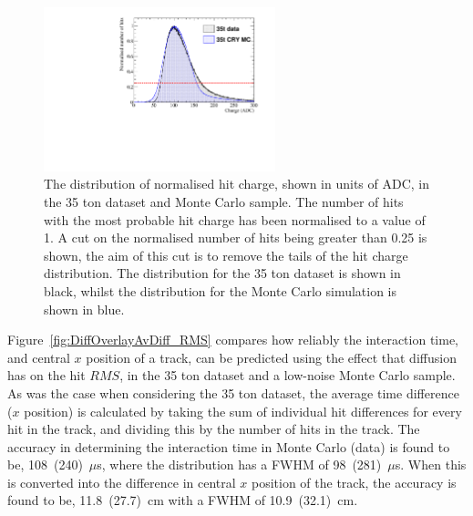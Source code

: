 \begin{figure}
  \centering
  \includegraphics[width=0.6\textwidth]{ChargeCutOverlay}
  \caption[The distribution of normalised hit charge in the 35 ton dataset and a Monte Carlo sample]
          {The distribution of normalised hit charge, shown in units of ADC, in the 35 ton dataset and Monte Carlo sample. The number of hits with the most probable hit charge has been normalised to a value of 1. A cut on the normalised number of hits being greater than 0.25 is shown, the aim of this cut is to remove the tails of the hit charge distribution. The distribution for the 35 ton dataset is shown in black, whilst the distribution for the Monte Carlo simulation is shown in blue.}
  \label{fig:DiffOverlay_ChargeCut}
\end{figure}

Figure~\ref{fig:DiffOverlayAvDiff_RMS} compares how reliably the interaction time, and central $x$ position of a track, can be predicted using the effect that diffusion has on the hit $RMS$, in the 35 ton dataset and a low-noise Monte Carlo sample. As was the case when considering the 35 ton dataset, the average time difference ($x$ position) is calculated by taking the sum of individual hit differences for every hit in the track, and dividing this by the number of hits in the track. The accuracy in determining the interaction time in Monte Carlo (data) is found to be, 108~(240)~$\mu$s, where the distribution has a FWHM of 98~(281)~$\mu$s. When this is converted into the difference in central $x$ position of the track, the accuracy is found to be, 11.8~(27.7)~cm with a FWHM of 10.9~(32.1)~cm. \\

